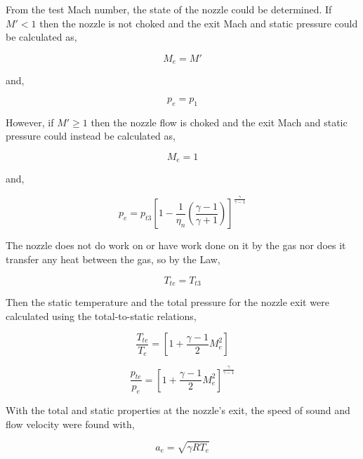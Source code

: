 \documentclass[conf]{new-aiaa} %
\begin{document}
From the test Mach number, the state of the nozzle could be determined. If $M'<1$ then the nozzle is not choked and the exit Mach and static pressure could be calculated as,

\begin{equation}
    \label{eqn:nchokeMe}
    M_e=M'
\end{equation}

and,

\begin{equation}
    \label{eqn:nchokepe}
    p_e=p_1
\end{equation}

However, if $M'\geq1$ then the nozzle flow is choked and the exit Mach and static pressure could instead be calculated as,

\begin{equation}
    \label{eqn:chokeMe}
    M_e=1
\end{equation}

and,

\begin{equation}
    \label{eqn:chokepe}
    p_e=p_{t3}\left[1-\frac{1}{\eta_n}\left(\frac{\gamma-1}{\gamma+1}\right)\right]^\frac{\gamma}{\gamma-1}
\end{equation}

The nozzle does not do work on or have work done on it by the gas nor does it transfer any heat between the gas, so by the  Law,

\begin{equation}
    \label{eqn:Tte}
    T_{te}=T_{t3}
\end{equation}

Then the static temperature and the total pressure for the nozzle exit were calculated using the total-to-static relations,

\begin{equation}
    \label{eqn:Te}
    \frac{T_{te}}{T_e}=\left[1+\frac{\gamma-1}{2}M_e^2\right]
\end{equation}

\begin{equation}
    \label{eqn:pte}
    \frac{p_{te}}{p_e}=\left[1+\frac{\gamma-1}{2}M_e^2\right]^\frac{\gamma}{\gamma-1}
\end{equation}

With the total and static properties at the nozzle's exit, the speed of sound and flow velocity were found with,

\begin{equation}
    \label{eqn:ae}
    a_e=\sqrt{\gamma R T_e}
\end{equation}
\end{document}
